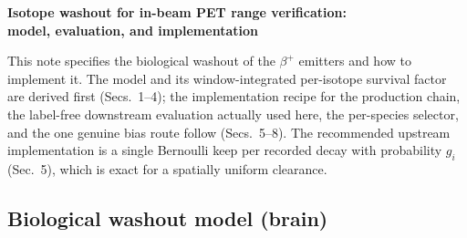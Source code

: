 \documentclass[11pt]{article}
\begin{document}
\begin{center}
  {\large\textbf{Isotope washout for in-beam PET range verification:}}\\[2pt]
  {\large\textbf{model, evaluation, and implementation}}
\end{center}
\medskip

\noindent
This note specifies the biological washout of the $\beta^+$ emitters and how to
implement it. The model and its window-integrated per-isotope survival factor are
derived first (Secs.~1--4); the implementation recipe for the production chain,
the label-free downstream evaluation actually used here, the per-species selector,
and the one genuine bias route follow (Secs.~5--8). The recommended upstream
implementation is a single Bernoulli keep per recorded decay with probability
$g_i$ (Sec.~5), which is exact for a spatially uniform clearance.

\subsection*{Biological washout model (brain)}
\end{document}
